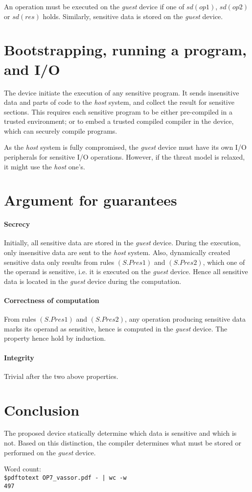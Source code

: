 \documentclass{article}
\begin{document}
An operation must be executed on the \emph{guest} device if one of $sd(op1)$, $sd(op2)$ or $sd(res)$ holds. Similarly, sensitive data is stored on the \emph{guest} device.

\section{Bootstrapping, running a program, and I/O}
The device initiate the execution of any sensitive program. It sends insensitive data and parts of code to the \emph{host} system, and collect the result for sensitive sections. This requires each sensitive program to be either pre-compiled in a trusted environment; or to embed a trusted compiled compiler in the device, which can securely compile programs.

As the \emph{host} system is fully compromised, the \emph{guest} device must have its own I/O peripherals for sensitive I/O operations. However, if the threat model is relaxed, it might use the \emph{host} one's. 
\section{Argument for guarantees}
\paragraph{Secrecy}
Initially, all sensitive data are stored in the \emph{guest} device. During the execution, only insensitive data are sent to the \emph{host} system. Also, dynamically created sensitive data only results from rules $(S.Pres1)$ and $(S.Pres2)$, which one of the operand is sensitive, i.e. it is executed on the \emph{guest} device. Hence all sensitive data is located in the \emph{guest} device during the computation.
\paragraph{Correctness of computation}
From rules $(S.Pres1)$ and $(S.Pres2)$, any operation producing sensitive data marks its operand as sensitive, hence is computed in the \emph{guest} device. The property hence hold by induction.
\paragraph{Integrity}
Trivial after the two above properties.

\section{Conclusion}
The proposed device statically determine which data is sensitive and which is not. Based on this distinction, the compiler determines what must be stored or performed on the \emph{guest} device. 

\vfill
{\color{gray}\noindent Word count: \\\texttt{\$pdftotext OP7\_vassor.pdf - | wc -w\\497}}
\end{document}
